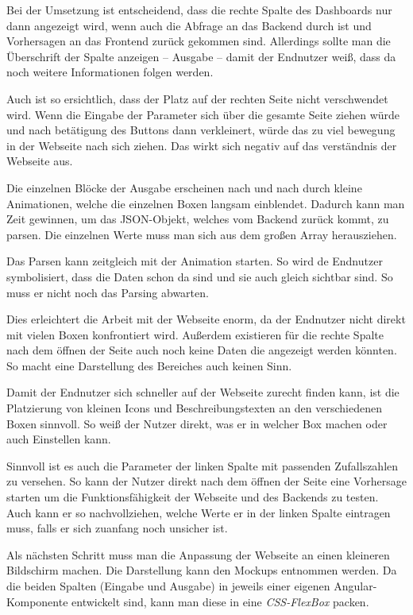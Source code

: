 Bei der Umsetzung ist entscheidend, dass die rechte Spalte des Dashboards nur dann angezeigt wird, wenn auch die Abfrage
an das Backend durch ist und Vorhersagen an das Frontend zurück gekommen sind. Allerdings sollte man die Überschrift
der Spalte anzeigen -- Ausgabe -- damit der Endnutzer weiß, dass da noch weitere Informationen
folgen werden.

Auch ist so ersichtlich, dass der Platz auf der rechten Seite nicht verschwendet wird. Wenn die Eingabe der Parameter
sich über die gesamte Seite ziehen würde und nach betätigung des Buttons dann verkleinert, würde das zu viel bewegung in
der Webseite nach sich ziehen. Das wirkt sich negativ auf das verständnis der Webseite aus.

Die einzelnen Blöcke der Ausgabe erscheinen nach und nach durch kleine Animationen, welche die einzelnen Boxen langsam
einblendet. Dadurch kann man Zeit gewinnen, um das JSON-Objekt, welches vom Backend zurück kommt, zu parsen. Die einzelnen
Werte muss man sich aus dem großen Array herausziehen.

Das Parsen kann zeitgleich mit der Animation starten. So wird de Endnutzer symbolisiert, dass die Daten schon da sind
und sie auch gleich sichtbar sind. So muss er nicht noch das Parsing abwarten.

Dies erleichtert die Arbeit mit der Webseite enorm, da der Endnutzer nicht direkt mit vielen Boxen konfrontiert wird.
Außerdem existieren für die rechte Spalte nach dem öffnen der Seite auch noch keine Daten die angezeigt werden könnten.
So macht eine Darstellung des Bereiches auch keinen Sinn.

Damit der Endnutzer sich schneller auf der Webseite zurecht finden kann, ist die Platzierung von kleinen Icons und
Beschreibungstexten an den verschiedenen Boxen sinnvoll. So weiß der Nutzer direkt, was er in welcher Box machen oder
auch Einstellen kann.

Sinnvoll ist es auch die Parameter der linken Spalte mit passenden Zufallszahlen zu versehen. So kann der Nutzer direkt
nach dem öffnen der Seite eine Vorhersage starten um die Funktionsfähigkeit der Webseite und des Backends zu testen.
Auch kann er so nachvollziehen, welche Werte er in der linken Spalte eintragen muss, falls er sich zuanfang noch
unsicher ist.

Als nächsten Schritt muss man die Anpassung der Webseite an einen kleineren Bildschirm machen. Die Darstellung kann den
Mockups entnommen werden. Da die beiden Spalten (Eingabe und Ausgabe) in jeweils einer eigenen Angular-Komponente
entwickelt sind, kann man diese in eine \textit{CSS-FlexBox} packen.


